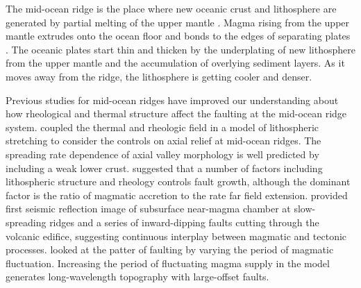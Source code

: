 \documentclass[letterpaper,12pt,notitle]{memphisthesis}                     %
\begin{document}
The mid-ocean ridge is the place where new oceanic crust and lithosphere are generated by partial melting of the upper mantle \citep{Cann1968}. Magma rising from the upper mantle extrudes onto the ocean floor and bonds to the edges of separating plates \citep{Chen1992}. The oceanic plates start thin and thicken by the underplating of new lithosphere from the upper mantle and the accumulation of overlying sediment layers. As it moves away from the ridge, the lithosphere is getting cooler and denser.


Previous studies for mid-ocean ridges have improved our understanding about how rheological and thermal structure affect the faulting at the mid-ocean ridge system.
\citet{Chen1990} coupled the thermal and rheologic field in a model of lithospheric stretching to consider the controls on axial relief at mid-ocean ridges. The spreading rate dependence of axial valley morphology is well predicted by including a weak lower crust. \citet{Behn2008} suggested that a number of factors including lithospheric structure and rheology controls fault growth, although the dominant factor is the ratio of magmatic accretion to the rate far field extension. \citet{Singh2006} provided first seismic reflection image of subsurface near-magma chamber at slow-spreading ridges and a series of inward-dipping faults cutting through the volcanic edifice, suggesting continuous interplay between magmatic and tectonic processes. \citet{Olive2015} looked at the patter of faulting by varying the period of magmatic fluctuation. Increasing the period of fluctuating magma supply in the model generates long-wavelength topography with large-offset faults.
\end{document}
